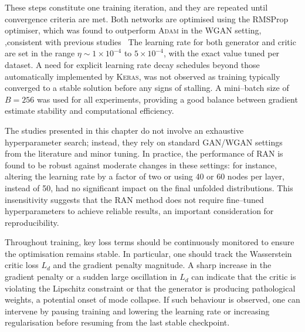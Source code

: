 {{\begin{algorithm}
{          
        }
        \end{algorithm}
        These steps constitute one training iteration, and they are repeated until convergence criteria are met.
        Both networks are optimised using the RMSProp optimiser, which was found to outperform \textsc{Adam} in the WGAN setting, ,consistent with previous studies~\cite{henderson_where_2018}
        The learning rate for both generator and critic are set in the range $\eta \sim 1\times10^{-4}$ to $5\times10^{-4}$, with the exact value tuned per dataset.
        A need for explicit learning rate decay schedules beyond those automatically implemented by \textsc{Keras}, was not observed as training typically converged to a stable solution before any signs of stalling.
        A mini--batch size of $B=256$ was used for all experiments, providing a good balance between gradient estimate stability and computational efficiency.
        
        The studies presented in this chapter do not involve an exhaustive hyperparameter search; instead, they rely on standard GAN/WGAN settings from the literature and minor tuning.
        In practice, the performance of RAN is found to be robust against moderate changes in these settings: for instance, altering the learning rate by a factor of two or using 40 or 60 nodes per layer, instead of 50, had no significant impact on the final unfolded distributions.
        This insensitivity suggests that the RAN method does not require fine--tuned hyperparameters to achieve reliable results, an important consideration for reproducibility.
    
        Throughout training, key loss terms  should be continuously monitored to ensure the optimisation remains stable.
        In particular, one should track the Wasserstein critic loss $L_d$ and the gradient penalty magnitude.
        A sharp increase in the gradient penalty or a sudden large oscillation in $L_d$ can indicate that the critic is violating the Lipschitz constraint or that the generator is producing pathological weights, a potential onset of mode collapse.
        If such behaviour is observed, one can intervene by pausing training and lowering the learning rate or increasing regularisation before resuming from the last stable checkpoint.
        
}}
